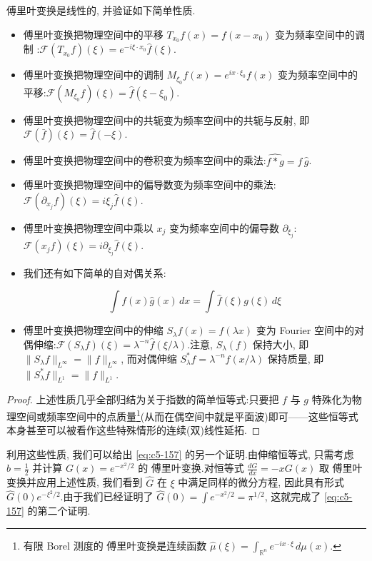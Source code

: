 \begin{proposition}\label{prop:c5-1.2}
傅里叶变换是线性的, 并验证如下简单性质.

\begin{itemize}
\item 傅里叶变换把物理空间中的平移 $T_{x_0}f(x) = f(x-x_0)$ 变为频率空间中的调制 :$\mathcal{F}(T_{x_0}f)(\xi) = e^{-i\xi\cdot x_0}\hat{f}(\xi)$.
\item 傅里叶变换把物理空间中的调制 $M_{\xi_0}f(x) = e^{ix\cdot\xi_0}f(x)$ 变为频率空间中的平移:$\mathcal{F}(M_{\xi_0}f)(\xi) = \hat{f}(\xi-\xi_0)$.
\item 傅里叶变换把物理空间中的共轭变为频率空间中的共轭与反射, 即 $\mathcal{F}(\bar{f})(\xi) = \hat{f}(-\xi)$.
\item 傅里叶变换把物理空间中的卷积变为频率空间中的乘法:$\widehat{f*g} = \hat{f}\, \hat{g}$.
\item 傅里叶变换把物理空间中的偏导数变为频率空间中的乘法:$\mathcal{F}(\partial_{x_j}f)(\xi) = i\xi_j\hat{f}(\xi)$.
\item 傅里叶变换把物理空间中乘以 $x_j$ 变为频率空间中的偏导数 $\partial_{\xi_j}$:$\mathcal{F}(x_jf)(\xi) = i\partial_{\xi_j}\hat{f}(\xi)$.
\item 我们还有如下简单的自对偶关系:

\[
\int f(x)\hat{g}(x)\, dx = \int\hat{f}(\xi)g(\xi)\, d\xi
\]

\item 傅里叶变换把物理空间中的伸缩 $S_\lambda f(x) = f(\lambda x)$ 变为 Fourier 空间中的对偶伸缩:$\mathcal{F}(S_\lambda f)(\xi) = \lambda^{-n}\hat{f}(\xi/\lambda)$.注意, $S_\lambda(f)$ 保持大小, 即 $\|S_\lambda f\|_{L^\infty} = \|f\|_{L^\infty}$, 而对偶伸缩 $S_\lambda^* f = \lambda^{-n}f(x/\lambda)$ 保持质量, 即 $\|S_\lambda^* f\|_{L^1} = \|f\|_{L^1}$.
\end{itemize}
\end{proposition}

\begin{proof}
上述性质几乎全部归结为关于指数的简单恒等式:只要把 $f$ 与 $g$ 特殊化为物理空间或频率空间中的点质量\footnote{有限 Borel 测度的 傅里叶变换是连续函数 $\hat{\mu}(\xi) = \int_{\mathbb{R}^n} e^{-ix\cdot\xi}\, d\mu(x)$.}(从而在偶空间中就是平面波)即可——这些恒等式本身甚至可以被看作这些特殊情形的连续(双)线性延拓.
\end{proof}

利用这些性质, 我们可以给出 \eqref{eq:c5-157} 的另一个证明.由伸缩恒等式, 只需考虑 $b = \frac{1}{2}$ 并计算 $G(x) = e^{-x^2/2}$ 的 傅里叶变换.对恒等式 $\frac{dG}{dx} = -xG(x)$ 取 傅里叶变换并应用上述性质, 我们看到 $\hat{G}$ 在 $\xi$ 中满足同样的微分方程, 因此具有形式 $\hat{G}(0)e^{-\xi^2/2}$.由于我们已经证明了 $\hat{G}(0) = \int e^{-x^2/2} = \pi^{1/2}$, 这就完成了 \eqref{eq:c5-157} 的第二个证明.

